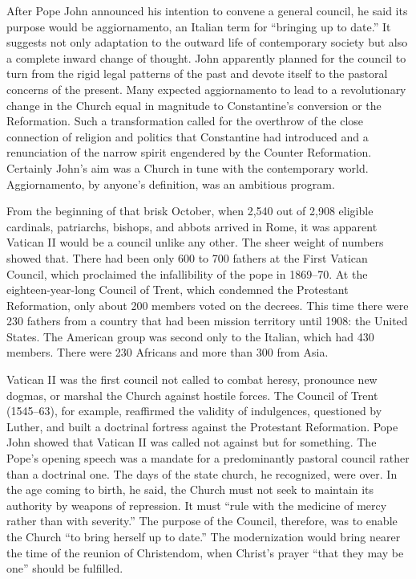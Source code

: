 After Pope John announced his intention to convene a general council, he said its purpose would be
aggiornamento, an Italian term for “bringing up to date.” It suggests not only adaptation to the
outward life of contemporary society but also a complete inward change of thought. John apparently
planned for the council to turn from the rigid legal patterns of the past and devote itself to the
pastoral concerns of the present. Many expected aggiornamento to lead to a revolutionary change in
the Church equal in magnitude to Constantine’s conversion or the Reformation. Such a transformation
called for the overthrow of the close connection of religion and politics that Constantine had
introduced and a renunciation of the narrow spirit engendered by the Counter Reformation. Certainly
John’s aim was a Church in tune with the contemporary world. Aggiornamento, by anyone’s definition,
was an ambitious program.

From the beginning of that brisk October, when 2,540 out of 2,908 eligible cardinals, patriarchs,
bishops, and abbots arrived in Rome, it was apparent Vatican II would be a council unlike any other.
The sheer weight of numbers showed that. There had been only 600 to 700 fathers at the First Vatican
Council, which proclaimed the infallibility of the pope in 1869–70. At the eighteen-year-long
Council of Trent, which condemned the Protestant Reformation, only about 200 members voted on the
decrees. This time there were 230 fathers from a country that had been mission territory until 1908:
the United States. The American group was second only to the Italian, which had 430 members. There
were 230 Africans and more than 300 from Asia.

Vatican II was the first council not called to combat heresy, pronounce new dogmas, or marshal the
Church against hostile forces. The Council of Trent (1545–63), for example, reaffirmed the validity
of indulgences, questioned by Luther, and built a doctrinal fortress against the Protestant
Reformation. Pope John showed that Vatican II was called not against but for something. The Pope’s
opening speech was a mandate for a predominantly pastoral council rather than a doctrinal one. The
days of the state church, he recognized, were over. In the age coming to birth, he said, the Church
must not seek to maintain its authority by weapons of repression. It must “rule with the medicine of
mercy rather than with severity.” The purpose of the Council, therefore, was to enable the Church
“to bring herself up to date.” The modernization would bring nearer the time of the reunion of
Christendom, when Christ’s prayer “that they may be one” should be fulfilled.

